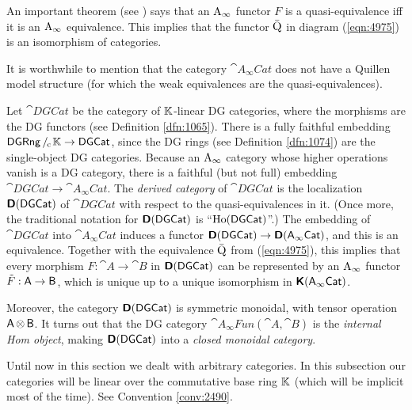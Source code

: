 \begin{rem}
An important theorem (see \cite[Theorem 9.2.0.4 ]{Lef}) says that 
an $\mathrm{A}_{\infty}$ functor $F$ is a quasi-equivalence iff it is an
 $\mathrm{A}_{\infty}$ equivalence. This implies that the functor 
$\bar{\operatorname{Q}}$ in diagram (\ref{eqn:4975}) is an isomorphism of categories. 

It is worthwhile to mention that the category $\cat{A_{\infty}Cat}$
does not have a Quillen model structure (for which the weak equivalences are 
the quasi-equivalences). 

Let $\cat{DGCat}$ be the category of $\mathbb{K}$-linear DG categories, where the 
morphisms are the DG functors (see Definition \ref{dfn:1065}). 
There is a fully faithful embedding 
$\operatorname{\mathsf{DGRng}} /_{\mspace{-2mu} \mathrm{c}} \mspace{2mu} \mathbb{K} \to \operatorname{\mathsf{DGCat}}$,
since the DG rings (see Definition \ref{dfn:1074}) are the 
single-object DG categories.
Because an $\mathrm{A}_{\infty}$ category whose higher operations vanish is a DG 
category, there is a faithful (but not full) embedding
$\cat{DGCat} \to \cat{A_{\infty}Cat}$.
The {\em derived category} of $\cat{DGCat}$
is the localization $\boldsymbol{\mathsf{D}}(\operatorname{\mathsf{DGCat}})$ of $\cat{DGCat}$ with 
respect to the quasi-equivalences in it. 
(Once more, the traditional notation for $\boldsymbol{\mathsf{D}}(\operatorname{\mathsf{DGCat}})$
is ``$\operatorname{Ho}(\operatorname{\mathsf{DGCat}})$''.)
The embedding of $\cat{DGCat}$ into $\cat{A_{\infty}Cat}$ induces a functor 
$\dcat{D}(\cat{DGCat}) \lb \to \dcat{D}(\cat{A_{\infty}Cat})$,
and this is an equivalence. Together with the 
equivalence $\bar{\operatorname{Q}}$ from (\ref{eqn:4975}), this implies that
every morphism $F : \cat{A} \to \cat{B}$ in 
$\boldsymbol{\mathsf{D}}(\operatorname{\mathsf{DGCat}})$
can be represented by an $\mathrm{A}_{\infty}$ functor 
$\tilde{F} : \operatorname{\mathsf{A}} \to \operatorname{\mathsf{B}}$, which is unique up to a unique isomorphism in 
$\boldsymbol{\mathsf{K}}(\operatorname{\mathsf{A_{\infty}Cat}})$. 

Moreover, the category $\boldsymbol{\mathsf{D}}(\operatorname{\mathsf{DGCat}})$ is 
symmetric monoidal, with tensor operation $\operatorname{\mathsf{A}} \otimes \operatorname{\mathsf{B}}$. 
It turns out that the DG category 
$\cat{A_{\infty}Fun}(\cat{A}, \cat{B})$
is the {\em internal Hom object}, making  
$\boldsymbol{\mathsf{D}}(\operatorname{\mathsf{DGCat}})$ into a {\em closed monoidal category}.
\end{rem}





 \label{subsec:loc-lin}

Until now in this section we dealt with arbitrary categories. 
In this subsection our categories will be linear over the 
commutative base ring $\mathbb{K}$ (which will be implicit most of the time).
See Convention \ref{conv:2490}. 

